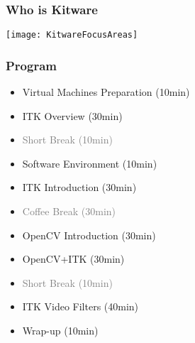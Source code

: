 \documentclass[18pt]{beamer}
\begin{document}
\begin{frame}
\frametitle{Who is Kitware}
\begin{center}
\texttt{[image: KitwareFocusAreas]}
\end{center}
\end{frame}

\begin{frame}
\frametitle{Program}
\begin{itemize}
\item Virtual Machines Preparation (10min)
\item ITK Overview (30min)
\item \textcolor{gray}{Short Break (10min)}
\item Software Environment (10min)
\item ITK Introduction (30min)
\item \textcolor{gray}{Coffee Break (30min)}
\item OpenCV Introduction (30min)
\item OpenCV+ITK (30min)
\item \textcolor{gray}{Short Break (10min)}
\item ITK Video Filters (40min)
\item Wrap-up (10min)
\end{itemize}
\end{frame}

















\end{document}
